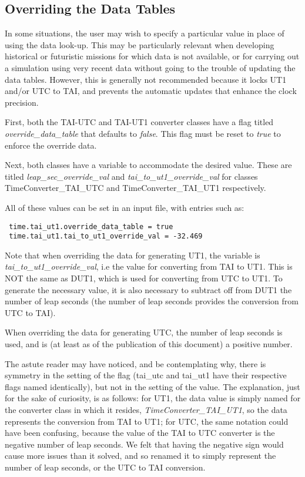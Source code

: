 \subsection{Overriding the Data Tables}\label{ref:data_override}
In some situations, the user may wish to specify a particular value in place of
using the data look-up.  This may be particularly relevant when developing
historical or futuristic missions for which data is not available, or for
carrying out a simulation using very recent data without going to the trouble
of updating the data tables.  However, this is generally not recommended because
it locks UT1 and/or UTC to TAI, and prevents the automatic updates that enhance
the clock precision.

First, both the TAI-UTC and TAI-UT1 converter classes have a flag
titled \textit{override\_data\_table} that defaults to \textit{false}.  This
flag must be reset to \textit{true} to enforce the override data.

Next, both classes have a variable to accommodate the desired value.  These are
titled \textit{leap\_sec\_override\_val} and \textit{tai\_to\_ut1\_override\_val}
for classes TimeConverter\_TAI\_UTC and TimeConverter\_TAI\_UT1 respectively.

All of these values can be set in an input file, with entries such as:
\begin{verbatim}
 time.tai_ut1.override_data_table = true
 time.tai_ut1.tai_to_ut1_override_val = -32.469
\end{verbatim}

Note that when overriding the data for generating UT1, the variable
is \textit{tai\_to\_ut1\_override\_val}, i.e the value for converting from TAI
to UT1.  This is NOT the same as DUT1, which is used for converting from UTC to
UT1.  To generate the necessary value, it is also necessary to subtract off from
DUT1 the number of leap seconds (the number of leap seconds provides the
conversion from UTC to TAI).

When overriding the data for generating UTC, the number of leap seconds is used,
and is (at least as of the publication of this document) a positive number.

The astute reader may have noticed, and be contemplating why, there is symmetry
in the setting of the flag (tai\_utc and tai\_ut1 have their respective flags
named identically), but not in the setting of the value.  The explanation, just
for the sake of curiosity, is as follows:  for UT1, the data value is simply
named for the converter class in which it resides, \textit{TimeConverter\_TAI\_UT1},
so the data represents the conversion from TAI to UT1; for UTC, the same
notation could have been confusing, because the value of the TAI to UTC
converter is the negative number of leap seconds.  We felt that having the 
negative sign would cause more issues than it solved, and so renamed it to
simply represent the number of leap seconds, or the UTC to TAI conversion.
